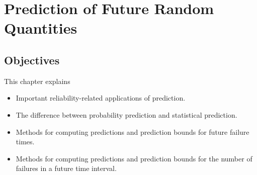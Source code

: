 
\setcounter{chapter}{11}

\chapter{Prediction of Future Random Quantities}

\label{chapter:prediction}



\section*{Objectives}
This chapter explains
\begin{itemize} 
\item 
Important reliability-related
applications of prediction.
\item 
The difference between probability prediction and statistical
prediction.
\item 
Methods for computing predictions
and prediction bounds for future failure times.
\item 
Methods for computing predictions and prediction bounds for the
number of failures in a future time interval.
\end{itemize}

